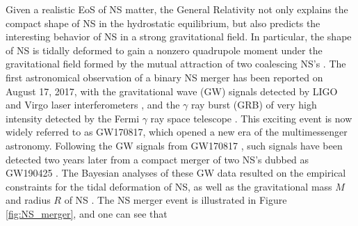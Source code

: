 Given a realistic EoS of NS matter, the General Relativity not only explains 
the compact shape of NS in the hydrostatic equilibrium, but also predicts the interesting 
behavior of NS in a strong gravitational field. In particular, the shape of NS is 
tidally deformed to gain a nonzero quadrupole moment under the gravitational field 
formed by the mutual attraction of two coalescing NS's \cite{damour2009relativistic}. 
The first astronomical observation of a binary NS merger has been reported on August 17, 
2017, with the gravitational wave (\gls{GW}) signals detected by LIGO and Virgo laser 
interferometers \cite{abbott2017gw170817}, and the $\gamma$ ray burst (GRB) of very high intensity 
detected by the Fermi $\gamma$ ray space telescope \cite{abbott2017multi}. This exciting event 
is now widely referred to as GW170817, which opened a new era of the multimessenger 
astronomy. Following the GW signals from GW170817 \citep{abbott2017gw170817}, such signals have been detected two years later from a compact merger of two NS's dubbed as GW190425 
\citep{abbott2020gw190425}. The Bayesian analyses of these GW data resulted on the
empirical constraints for the tidal deformation of NS, as well as the gravitational 
mass $M$ and radius $R$ of NS \citep{abbott2018gw170817}. The \gls{NS} merger event 
is illustrated in Figure \ref{fig:NS_merger}, and one can see that
